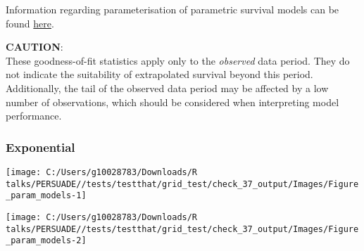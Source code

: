 \documentclass[
]{article}
\begin{document}
Information regarding parameterisation of parametric survival models can
be found
\href{https://devinincerti.com/code/survival-distributions.html}{here}.

\textbf{CAUTION}:\\
These goodness-of-fit statistics apply only to the \emph{observed} data
period. They do not indicate the suitability of extrapolated survival
beyond this period. Additionally, the tail of the observed data period
may be affected by a low number of observations, which should be
considered when interpreting model performance.

\clearpage

\begin{table}[H]
\centering
\caption{\label{tab:Table_2}Goodness of fit statistics}
\centering
{}
\end{table}

\clearpage

\clearpage

\subsubsection{Exponential}\label{exponential}

\begin{flushleft}\texttt{[image: C:/Users/g10028783/Downloads/R talks/PERSUADE//tests/testthat/grid\_test/check\_37\_output/Images/Figure\_param\_models-1]} \end{flushleft}

\begin{flushleft}\texttt{[image: C:/Users/g10028783/Downloads/R talks/PERSUADE//tests/testthat/grid\_test/check\_37\_output/Images/Figure\_param\_models-2]} \end{flushleft}
\end{document}
